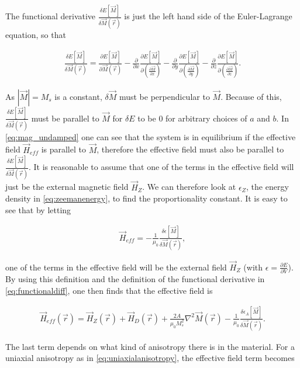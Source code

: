 \documentclass[1p]{elsarticle}		%
\begin{document}
The functional derivative $\frac{\delta E[\vec{M}]}{\delta \vec{M}(\vec{r})}$ is just the left hand side of the Euler-Lagrange equation, so that

\begin{align}
\label{eq:functionaldiff}
\frac{\delta E[\vec{M}]}{\delta \vec{M}(\vec{r})} = \frac{\partial E[\vec{M}]}{\partial \vec{M}(\vec{r})} - \frac{\partial}{\partial x} \frac{\partial E[\vec{M}]}{\partial (\frac{\partial \vec{M}}{\partial x})} - \frac{\partial}{\partial y} \frac{\partial E[\vec{M}]}{\partial (\frac{\partial \vec{M}}{\partial y})} - \frac{\partial}{\partial z} \frac{\partial E[\vec{M}]}{\partial (\frac{\partial \vec{M}}{\partial z})}.
\end{align}

As $|\vec{M}| = M_s$ is a constant, $\delta \vec{M}$ must be perpendicular to $\vec{M}$. Because of this, $\frac{\delta E[\vec{M}]}{\delta \vec{M}(\vec{r})}$ must be parallel to $\vec{M}$ for $\delta E$ to be 0 for arbitrary choices of $a$ and $b$. In \eqref{eq:mag_undamped} one can see that the system is in equilibrium if the effective field $\vec{H}_{eff}$ is parallel to $\vec{M}$, therefore the effective field must also be parallel to $\frac{\delta E[\vec{M}]}{\delta \vec{M}(\vec{r})}$. It is reasonable to assume that one of the terms in the effective field will just be the external magnetic field $\vec{H}_Z$. We can therefore look at $\epsilon_Z$, the energy density in \eqref{eq:zeemanenergy}, to find the proportionality constant. It is easy to see that by letting

\begin{align}
\vec{H}_{eff} = -\frac{1}{\mu_0}\frac{\delta \epsilon[\vec{M}]}{\delta \vec{M}(\vec{r})},
\end{align}

one of the terms in the effective field will be the external field $\vec{H}_Z$ (with $\epsilon = \frac{\partial E}{\partial V}$). By using this definition and the definition of the functional derivative in \eqref{eq:functionaldiff}, one then finds that the effective field is

\begin{align}
\label{eq:effectivefield}
\vec{H}_{eff}(\vec{r}) = \vec{H}_Z(\vec{r}) + \vec{H}_D(\vec{r}) + \frac{2A}{\mu_0M_s^2}\nabla^2\vec{M}(\vec{r}) -\frac{1}{\mu_0}\frac{\delta \epsilon_A[\vec{M}]}{\delta \vec{M}(\vec{r})}.
\end{align}

The last term depends on what kind of anisotropy there is in the material. For a uniaxial anisotropy as in \eqref{eq:uniaxialanisotropy}, the effective field term becomes 
\end{document}
